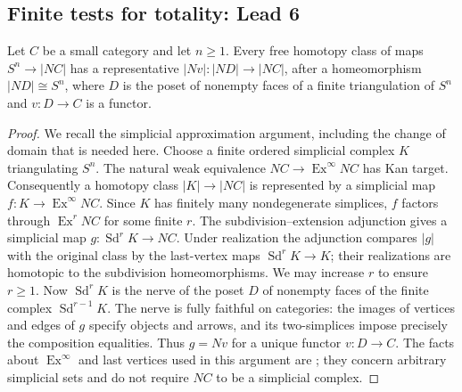 \subsection{Finite tests for totality: Lead 6}

\begin{lemma}\label{FT:sphere-representatives}
Let $C$ be a small category and let $n\geq1$. Every free homotopy class of
maps $S^n\to |NC|$ has a representative $|Nv|:|ND|\to |NC|$, after a
homeomorphism $|ND|\cong S^n$, where $D$ is the poset of nonempty faces of
a finite triangulation of $S^n$ and $v:D\to C$ is a functor.
\end{lemma}
\begin{proof}
We recall the simplicial approximation argument, including the change of
domain that is needed here. Choose a finite ordered simplicial complex $K$
triangulating $S^n$. The natural weak equivalence
$NC\longrightarrow\operatorname{Ex}^{\infty}NC$ has Kan target.
Consequently a homotopy class $|K|\to|NC|$ is represented by a simplicial
map $f:K\to\operatorname{Ex}^{\infty}NC$. Since $K$ has finitely many
nondegenerate simplices, $f$ factors through
$\operatorname{Ex}^rNC$ for some finite $r$. The subdivision--extension
adjunction gives a simplicial map
$g:\operatorname{Sd}^rK\to NC$. Under realization the adjunction compares
$|g|$ with the original class by the last-vertex maps
$\operatorname{Sd}^rK\to K$; their realizations are homotopic to the
subdivision homeomorphisms. We may increase $r$ to ensure $r\geq1$.
Now $\operatorname{Sd}^rK$ is the nerve of the poset $D$ of nonempty faces
of the finite complex $\operatorname{Sd}^{r-1}K$. The nerve is fully
faithful on categories: the images of vertices and edges of $g$ specify
objects and arrows, and its two-simplices impose precisely the composition
equalities. Thus $g=Nv$ for a unique functor $v:D\to C$.
The facts about $\operatorname{Ex}^{\infty}$ and last vertices used in
this argument are \cite[Theorem~I.11.4, Section~III.4, and
Theorem~III.4.8]{GoerssJardine2009}; they concern arbitrary simplicial sets
and do not require $NC$ to be a simplicial complex.
\end{proof}

